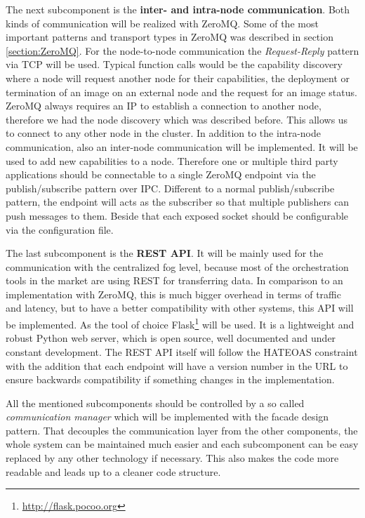 The next subcomponent is the \textbf{inter- and intra-node communication}.
Both kinds of communication will be realized with ZeroMQ.
Some of the most important patterns and transport types in ZeroMQ was described in section \ref{section:ZeroMQ}.
For the node-to-node communication the \textit{Request-Reply} pattern via \ac{TCP} will be used.
Typical function calls would be the capability discovery where a node will request another node for their capabilities, the deployment or termination of an image on an external node and the request for an image status.
ZeroMQ always requires an \ac{IP} to establish a connection to another node, therefore we had the node discovery which was described before.
This allows us to connect to any other node in the cluster.
In addition to the intra-node communication, also an inter-node communication will be implemented.
It will be used to add new capabilities to a node.
Therefore one or multiple third party applications should be connectable to a single ZeroMQ endpoint via the publish/subscribe pattern over \ac{IPC}.
Different to a normal publish/subscribe pattern, the endpoint will acts as the subscriber so that multiple publishers can push messages to them.
Beside that each exposed socket should be configurable via the configuration file.

The last subcomponent is the \textbf{\ac{REST} \ac{API}}.
It will be mainly used for the communication with the centralized fog level, because most of the orchestration tools in the market are using \ac{REST} for transferring data.
In comparison to an implementation with ZeroMQ, this is much bigger overhead in terms of traffic and latency, but to have a better compatibility with other systems, this \ac{API} will be implemented.
As the tool of choice Flask\footnote{\url{http://flask.pocoo.org}} will be used.
It is a lightweight and robust Python web server, which is open source, well documented and under constant development.
The \ac{REST} \ac{API} itself will follow the \ac{HATEOAS} constraint with the addition that each endpoint will have a version number in the \ac{URL} to ensure backwards compatibility if something changes in the implementation.

All the mentioned subcomponents should be controlled by a so called \textit{communication manager} which will be implemented with the facade design pattern.
That decouples the communication layer from the other components, the whole system can be maintained much easier and each subcomponent can be easy replaced by any other technology if necessary.
This also makes the code more readable and leads up to a cleaner code structure.


